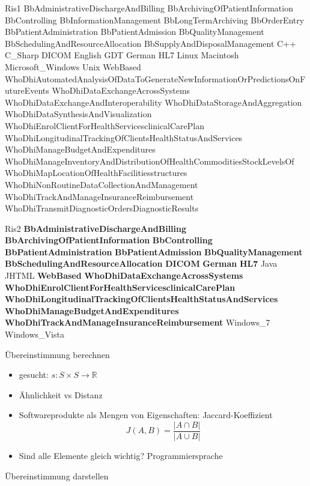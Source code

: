 \documentclass[aspectratio=1610]{beamer}
\newcommand{\both}[1]{{\color[rgb]{0.8,1,0.8}\textbf{#1}}}
\begin{document}
\begin{frame}{Ris1}
BbAdministrativeDischargeAndBilling
BbArchivingOfPatientInformation
BbControlling
BbInformationManagement
BbLongTermArchiving
BbOrderEntry
BbPatientAdministration
BbPatientAdmission
BbQualityManagement
BbSchedulingAndResourceAllocation
BbSupplyAndDisposalManagement
C++
C\_Sharp
DICOM
English
GDT
German
HL7
Linux
Macintosh
Microsoft\_Windows
Unix
WebBased
WhoDhiAutomatedAnalysisOfDataToGenerateNewInformationOrPredictionsOnFutureEvents
WhoDhiDataExchangeAcrossSystems
WhoDhiDataExchangeAndInteroperability
WhoDhiDataStorageAndAggregation
WhoDhiDataSynthesisAndVisualization
WhoDhiEnrolClientForHealthServicesclinicalCarePlan
WhoDhiLongitudinalTrackingOfClientsHealthStatusAndServices
WhoDhiManageBudgetAndExpenditures
WhoDhiManageInventoryAndDistributionOfHealthCommoditiesStockLevelsOf
WhoDhiMapLocationOfHealthFacilitiesstructures
WhoDhiNonRoutineDataCollectionAndManagement
WhoDhiTrackAndManageInsuranceReimbursement
WhoDhiTransmitDiagnosticOrdersDiagnosticResults
\end{frame}

\begin{frame}{Ris2}
\both{BbAdministrativeDischargeAndBilling}
\both{BbArchivingOfPatientInformation}
\both{BbControlling}
\both{BbPatientAdministration}
\both{BbPatientAdmission}
\both{BbQualityManagement}
\both{BbSchedulingAndResourceAllocation}
\both{DICOM}
\both{German}
\both{HL7}
Java
JHTML
\both{WebBased}
\both{WhoDhiDataExchangeAcrossSystems}
\both{WhoDhiEnrolClientForHealthServicesclinicalCarePlan}
\both{WhoDhiLongitudinalTrackingOfClientsHealthStatusAndServices}
\both{WhoDhiManageBudgetAndExpenditures}
\both{WhoDhiTrackAndManageInsuranceReimbursement}
Windows\_7
Windows\_Vista
\end{frame}

\begin{frame}{Übereinstimmung berechnen}
\begin{itemize}
\item gesucht: $s: S \times S \rightarrow  \mathbb{R}$
\item Ähnlichkeit vs Distanz
\pause
\item Softwareprodukte als Mengen von Eigenschaften: Jaccard-Koeffizient \[J(A,B) = \frac{|A \cap B|}{|A \cup B|}\]
\pause
\item Sind alle Elemente gleich wichtig? Programmiersprache
\end{itemize}
\end{frame}

\begin{frame}{Übereinstimmung darstellen}

\end{frame}

\iffalse

\fi
\end{document}
